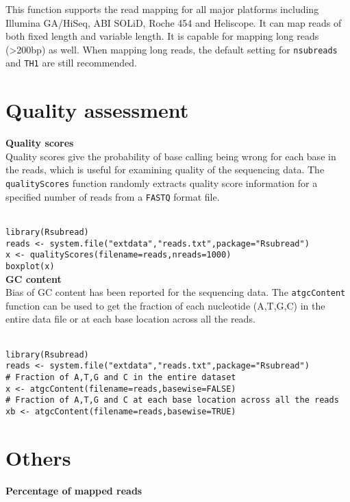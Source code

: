 \documentclass[12pt]{article}
\newcommand{\R}[1]{{\texttt{#1}}}
\begin{document}
This function supports the read mapping for all major platforms including Illumina GA/HiSeq, ABI SOLiD, Roche 454 and Heliscope.
It can map reads of both fixed length and variable length.
It is capable for mapping long reads (>200bp) as well.
When mapping long reads, the default setting for \R{nsubreads} and \R{TH1} are still recommended.

\section{Quality assessment}
{\noindent\bf Quality scores\\}
Quality scores give the probability of base calling being wrong for each base in the reads, which is useful for examining quality of the sequencing data.
The \R{qualityScores} function randomly extracts quality score information for a specified number of reads from a \R{FASTQ} format file.

\R{\\
library(Rsubread)\\
reads <- system.file("extdata","reads.txt",package="Rsubread")\\
x <- qualityScores(filename=reads,nreads=1000)\\
boxplot(x)
}\\

{\noindent\bf GC content\\}
Bias of GC content has been reported for the sequencing data.
The \R{atgcContent} function can be used to get the fraction of each nucleotide (A,T,G,C) in the entire data file or at each base location across all the reads.

\R{\\
library(Rsubread)\\
reads <- system.file("extdata","reads.txt",package="Rsubread")\\
\# Fraction of A,T,G and C in the entire dataset\\
x <- atgcContent(filename=reads,basewise=FALSE)\\
\# Fraction of A,T,G and C at each base location across all the reads\\
xb <- atgcContent(filename=reads,basewise=TRUE)\\
}

\section{Others}
{\noindent\bf Percentage of mapped reads}\\
\end{document}
